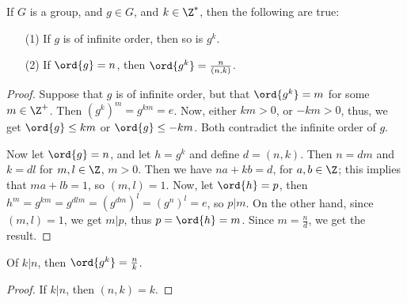 \begin{lemma}\label{2.3.6}
    If $G$ is a group, and  $g \in G$, and  $k \in \Z^*$, then the following are
    true:
    \begin{enumerate}
        \item[(1)] If $g$ is of infinite order, then so is  $g^k$.

        \item [(2)] If $\ord{g}=n$, then $\ord{g^k}=\frac{n}{(n,k)}$.
    \end{enumerate}
\end{lemma}
\begin{proof}
    Suppose that $g$ is of infinite order, but that  $\ord{g^k}=m$ for some $m
    \in \Z^+$. Then  $(g^k)^m=g^{km}=e$. Now, either $km>0$, or  $-km>0$, thus,
    we get  $\ord{g} \leq km$ or $\ord{g} \leq -km$. Both contradict the
    infinite order of $g$.

    Now let  $\ord{g}=n$, and let $h=g^k$ and define  $d=(n,k)$. Then $n=dm$ and
     $k=dl$ for  $m,l \in \Z$,  $m>0$. Then we have $na+kb=d$, for $a,b \in \Z$;
     this implies that  $ma+lb=1$, so  $(m,l)=1$. Now, let $\ord{h}=p$, then
     $h^m=g^{km}=g^{dlm}=(g^{dm})^l=(g^n)^l=e$, so $p|m$. On the other hand,
     since  $(m,l)=1$, we get $m|p$, thus  $p=\ord{h}=m$. Since $m=\frac{n}{d}$,
     we get the result.
\end{proof}
\begin{corollary}
    Of $k|n$, then  $\ord{g^k}=\frac{n}{k}$.
\end{corollary}
\begin{proof}
    If $k|n$, then  $(n,k)=k$.
\end{proof}

